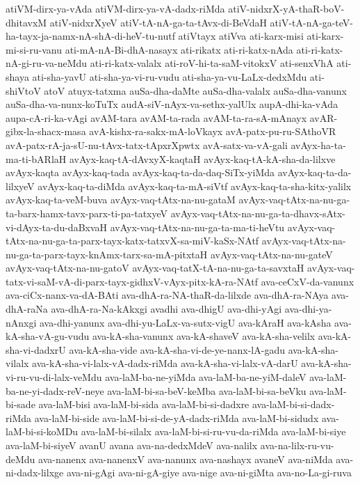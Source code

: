 {atiVM-dirx-ya-vAda
atiVM-dirx-ya-vA-dadx-riMda
atiV-nidxrX-yA-thaR-boV-dhitavxM
atiV-nidxrXyeV
atiV-tA-nA-ga-ta-tAvx-di-BeVdaH
atiV-tA-nA-ga-teV-ha-tayx-ja-namx-nA-shA-di-heV-tu-nutf
atiVtayx
atiVva
ati-karx-misi
ati-karx-mi-si-ru-vanu
ati-mA-nA-Bi-dhA-nasayx
ati-rikatx
ati-ri-katx-nAda
ati-ri-katx-nA-gi-ru-va-neMdu
ati-ri-katx-valalx
ati-roV-hi-ta-saM-vitokxV
ati-senxVhA
ati-shaya
ati-sha-yavU
ati-sha-ya-vi-ru-vudu
ati-sha-ya-vu-LaLx-dedxMdu
ati-shiVtoV
atoV
atuyx-tatxma
auSa-dha-daMte
auSa-dha-valalx
auSa-dha-vanunx
auSa-dha-va-nunx-koTuTx
audA-siV-nAyx-va-sethx-yalUlx
aupA-dhi-ka-vAda
aupa-cA-ri-ka-vAgi
avAM-tara
avAM-ta-rada
avAM-ta-ra-sA-mAnayx
avAR-gibx-la-shacx-masa
avA-kishx-ra-sakx-mA-loVkayx
avA-patx-pu-ru-SAthoVR
avA-patx-rA-ja-sU-nu-tAvx-tatx-tApxrXpwtx
avA-satx-va-vA-gali
avAyx-ha-ta-ma-ti-bARlaH
avAyx-kaq-tA-dAvxyX-kaqtaH
avAyx-kaq-tA-kA-sha-da-lilxve
avAyx-kaqta
avAyx-kaq-tada
avAyx-kaq-ta-da-daq-SiTx-yiMda
avAyx-kaq-ta-da-lilxyeV
avAyx-kaq-ta-diMda
avAyx-kaq-ta-mA-siVtf
avAyx-kaq-ta-sha-kitx-yalilx
avAyx-kaq-ta-veM-buva
avAyx-vaq-tAtx-na-nu-gataM
avAyx-vaq-tAtx-na-nu-ga-ta-barx-hamx-tavx-parx-ti-pa-tatxyeV
avAyx-vaq-tAtx-na-nu-ga-ta-dhavx-sAtx-vi-dAyx-ta-du-daBxvaH
avAyx-vaq-tAtx-na-nu-ga-ta-ma-ti-heVtu
avAyx-vaq-tAtx-na-nu-ga-ta-parx-tayx-katx-tatxvX-sa-miV-kaSx-NAtf
avAyx-vaq-tAtx-na-nu-ga-ta-parx-tayx-knAmx-tarx-sa-mA-pitxtaH
avAyx-vaq-tAtx-na-nu-gateV
avAyx-vaq-tAtx-na-nu-gatoV
avAyx-vaq-tatX-tA-na-nu-ga-ta-savxtaH
avAyx-vaq-tatx-vi-saM-vA-di-parx-tayx-gidhxV-vAyx-pitx-kA-ra-NAtf
ava-ceCxV-da-vanunx
ava-ciCx-nanx-va-dA-BAti
ava-dhA-ra-NA-thaR-da-lilxde
ava-dhA-ra-NAya
ava-dhA-raNa
ava-dhA-ra-Na-kAkxgi
avadhi
ava-dhigU
ava-dhi-yAgi
ava-dhi-ya-nAnxgi
ava-dhi-yanunx
ava-dhi-yu-LaLx-va-sutx-vigU
ava-kAraH
ava-kAsha
ava-kA-sha-vA-gu-vudu
ava-kA-sha-vanunx
ava-kA-shaveV
ava-kA-sha-velilx
ava-kA-sha-vi-dadxrU
ava-kA-sha-vide
ava-kA-sha-vi-de-ye-nanx-lA-gadu
ava-kA-sha-vilalx
ava-kA-sha-vi-lalx-vA-dadx-riMda
ava-kA-sha-vi-lalx-vA-darU
ava-kA-sha-vi-ru-vu-di-lalx-veMdu
ava-laM-ba-ne-yiMda
ava-laM-ba-ne-yiM-daleV
ava-laM-ba-ne-yi-dadx-reV-neye
ava-laM-bi-sa-beV-keMba
ava-laM-bi-sa-beVku
ava-laM-bi-sade
ava-laM-bisi
ava-laM-bi-sida
ava-laM-bi-si-dadxre
ava-laM-bi-si-dadx-riMda
ava-laM-bi-side
ava-laM-bi-si-de-yA-dadx-riMda
ava-laM-bi-sidudx
ava-laM-bi-si-koMDu
ava-laM-bi-silalx
ava-laM-bi-si-ru-vu-da-riMda
ava-laM-bi-siye
ava-laM-bi-siyeV
avanU
avana
ava-na-dedxMdeV
ava-nalilx
ava-na-lilx-ru-vu-deMdu
ava-nanenx
ava-nanenxV
ava-nanunx
ava-nashayx
avaneV
ava-niMda
ava-ni-dadx-lilxge
ava-ni-gAgi
ava-ni-gA-giye
ava-nige
ava-ni-giMta
ava-no-La-gi-ruva
}
